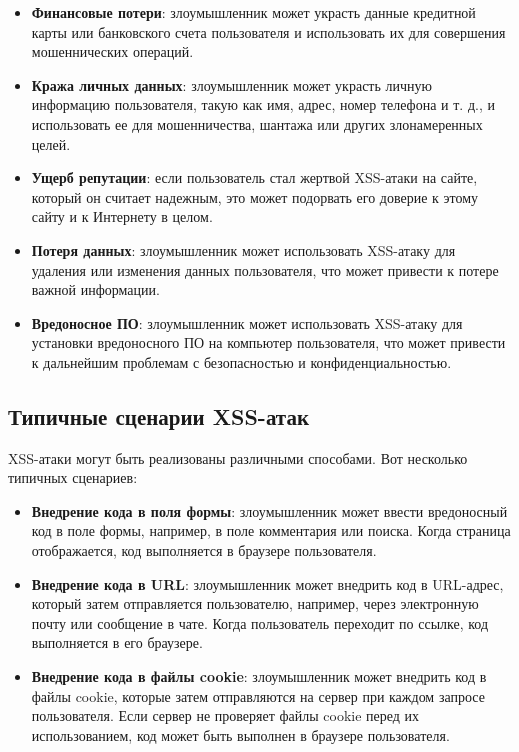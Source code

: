 \documentclass[a4paper,12pt]{diplom}
\begin{document}
	 \begin{itemize}
	 	\item \textbf{Финансовые потери}: злоумышленник может украсть данные кредитной карты или банковского счета пользователя и использовать их для совершения мошеннических операций.
	 	\item \textbf{Кража личных данных}: злоумышленник может украсть личную информацию пользователя, такую как имя, адрес, номер телефона и т. д., и использовать ее для мошенничества, шантажа или других злонамеренных целей.
	 	\item \textbf{Ущерб репутации}: если пользователь стал жертвой XSS-атаки на сайте, который он считает надежным, это может подорвать его доверие к этому сайту и к Интернету в целом.
	 	\item \textbf{Потеря данных}: злоумышленник может использовать XSS-атаку для удаления или изменения данных пользователя, что может привести к потере важной информации.
	 	\item \textbf{Вредоносное ПО}: злоумышленник может использовать XSS-атаку для установки вредоносного ПО на компьютер пользователя, что может привести к дальнейшим проблемам с безопасностью и конфиденциальностью.
	 \end{itemize}
	 
	 \subsection{Типичные сценарии XSS-атак}
	 
	 XSS-атаки могут быть реализованы различными способами. Вот несколько типичных сценариев:
	 
	 \begin{itemize}
	 	\item \textbf{Внедрение кода в поля формы}: злоумышленник может ввести вредоносный код в поле формы, например, в поле комментария или поиска. Когда страница отображается, код выполняется в браузере пользователя.
	 	\item \textbf{Внедрение кода в URL}: злоумышленник может внедрить код в URL-адрес, который затем отправляется пользователю, например, через электронную почту или сообщение в чате. Когда пользователь переходит по ссылке, код выполняется в его браузере.
	 	\item \textbf{Внедрение кода в файлы cookie}: злоумышленник может внедрить код в файлы cookie, которые затем отправляются на сервер при каждом запросе пользователя. Если сервер не проверяет файлы cookie перед их использованием, код может быть выполнен в браузере пользователя.
	 \end{itemize}
	 
\end{document}
